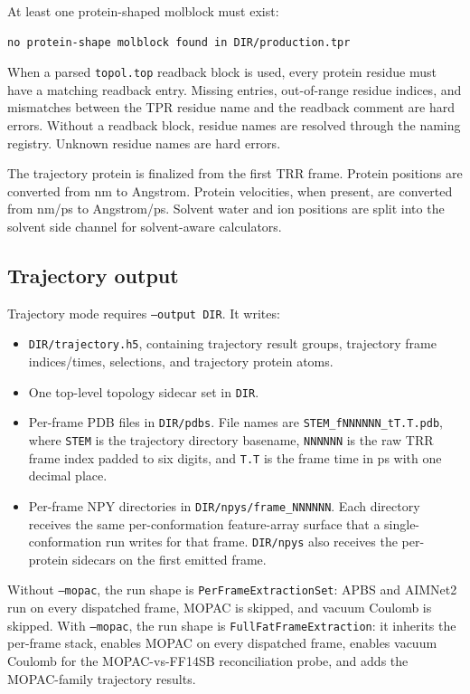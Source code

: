 \documentclass[11pt]{article}
\begin{document}
At least one protein-shaped molblock must exist:

\begin{lstlisting}
no protein-shape molblock found in DIR/production.tpr
\end{lstlisting}

When a parsed \texttt{topol.top} readback block is used, every protein residue
must have a matching readback entry. Missing entries, out-of-range residue
indices, and mismatches between the TPR residue name and the readback comment
are hard errors. Without a readback block, residue names are resolved through
the naming registry. Unknown residue names are hard errors.

The trajectory protein is finalized from the first TRR frame. Protein positions
are converted from nm to Angstrom. Protein velocities, when present, are
converted from nm/ps to Angstrom/ps. Solvent water and ion positions are split
into the solvent side channel for solvent-aware calculators.

\subsection{Trajectory output}

Trajectory mode requires \texttt{--output DIR}. It writes:

\begin{itemize}
\item \texttt{DIR/trajectory.h5}, containing trajectory result groups,
  trajectory frame indices/times, selections, and trajectory protein atoms.
\item One top-level topology sidecar set in \texttt{DIR}.
\item Per-frame PDB files in \texttt{DIR/pdbs}. File names are
  \texttt{STEM\_fNNNNNN\_tT.T.pdb}, where \texttt{STEM} is the trajectory
  directory basename, \texttt{NNNNNN} is the raw TRR frame index padded to six
  digits, and \texttt{T.T} is the frame time in ps with one decimal place.
\item Per-frame NPY directories in \texttt{DIR/npys/frame\_NNNNNN}. Each
  directory receives the same per-conformation feature-array surface that a
  single-conformation run writes for that frame. \texttt{DIR/npys} also
  receives the per-protein sidecars on the first emitted frame.
\end{itemize}

Without \texttt{--mopac}, the run shape is
\texttt{PerFrameExtractionSet}: APBS and AIMNet2 run on every dispatched frame,
MOPAC is skipped, and vacuum Coulomb is skipped. With \texttt{--mopac}, the
run shape is \texttt{FullFatFrameExtraction}: it inherits the per-frame stack,
enables MOPAC on every dispatched frame, enables vacuum Coulomb for the
MOPAC-vs-FF14SB reconciliation probe, and adds the MOPAC-family trajectory
results.
\end{document}
